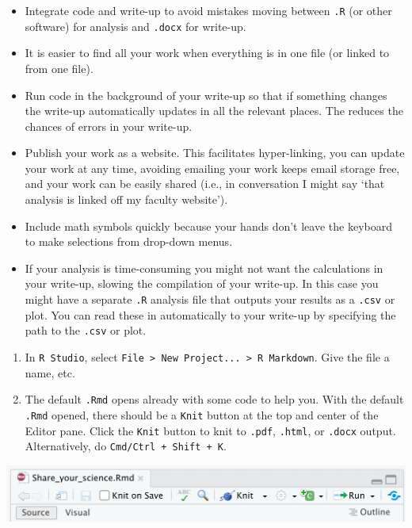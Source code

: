 \documentclass[
]{book}
\begin{document}
\begin{itemize}
\item
  Integrate code and write-up to avoid mistakes moving between \texttt{.R} (or other software) for analysis and \texttt{.docx} for write-up.
\item
  It is easier to find all your work when everything is in one file (or linked to from one file).
\item
  Run code in the background of your write-up so that if something changes the write-up automatically updates in all the relevant places. The reduces the chances of errors in your write-up.
\item
  Publish your work as a website. This facilitates hyper-linking, you can update your work at any time, avoiding emailing your work keeps email storage free, and your work can be easily shared (i.e., in conversation I might say `that analysis is linked off my faculty website').
\item
  Include math symbols quickly because your hands don't leave the keyboard to make selections from drop-down menus.
\item
  If your analysis is time-consuming you might not want the calculations in your write-up, slowing the compilation of your write-up. In this case you might have a separate \texttt{.R} analysis file that outputs your results as a \texttt{.csv} or plot. You can read these in automatically to your write-up by specifying the path to the \texttt{.csv} or plot.
\end{itemize}

\begin{enumerate}
\def\labelenumi{\arabic{enumi}.}
\item
  In \texttt{R\ Studio}, select \texttt{File\ \textgreater{}\ New\ Project...\ \textgreater{}\ R\ Markdown}. Give the file a name, etc.
\item
  The default \texttt{.Rmd} opens already with some code to help you. With the default \texttt{.Rmd} opened, there should be a \texttt{Knit} button at the top and center of the Editor pane. Click the \texttt{Knit} button to knit to \texttt{.pdf}, \texttt{.html}, or \texttt{.docx} output. Alternatively, do \texttt{Cmd/Ctrl\ +\ Shift\ +\ K}.
\end{enumerate}

\begin{center}\includegraphics[width=0.5\linewidth]{figures/Knit} \end{center}
\end{document}
